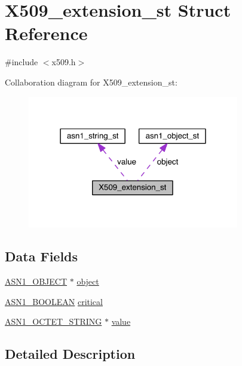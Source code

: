 \hypertarget{struct_x509__extension__st}{}\section{X509\+\_\+extension\+\_\+st Struct Reference}
\label{struct_x509__extension__st}


{\ttfamily \#include $<$x509.\+h$>$}



Collaboration diagram for X509\+\_\+extension\+\_\+st\+:\nopagebreak
\begin{figure}[H]
\begin{center}
\leavevmode
\includegraphics[width=262pt]{struct_x509__extension__st__coll__graph}
\end{center}
\end{figure}
\subsection*{Data Fields}
\begin{DoxyCompactItemize}
\item 
\hyperlink{crypto_2ossl__typ_8h_ae3fda0801e4c8e250087052bafb3ce2e}{A\+S\+N1\+\_\+\+O\+B\+J\+E\+CT} $\ast$ \hyperlink{struct_x509__extension__st_aac268aa1904733da5af63d97def610c4}{object}
\item 
\hyperlink{crypto_2ossl__typ_8h_abab3d5c6a3b9e049d27737dc227c0849}{A\+S\+N1\+\_\+\+B\+O\+O\+L\+E\+AN} \hyperlink{struct_x509__extension__st_a2afa222504cf61c78a0f916f153ebb63}{critical}
\item 
\hyperlink{crypto_2ossl__typ_8h_afbd05e94e0f0430a2b729473efec88c1}{A\+S\+N1\+\_\+\+O\+C\+T\+E\+T\+\_\+\+S\+T\+R\+I\+NG} $\ast$ \hyperlink{struct_x509__extension__st_a3484b8a1534b1edc0debea393f4586a0}{value}
\end{DoxyCompactItemize}


\subsection{Detailed Description}


